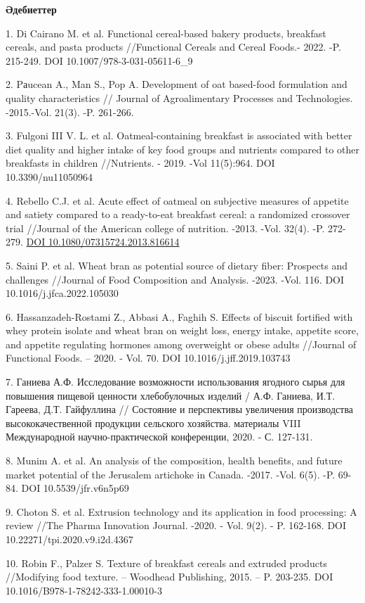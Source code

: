 \begin{center}
{\bfseries Әдебиеттер}
\end{center}

\begin{references}
1. Di Cairano M. et al. Functional cereal-based bakery products,
breakfast cereals, and pasta products //Functional Cereals and Cereal
Foods.- 2022. -P. 215-249. DOI 10.1007/978-3-031-05611-6\_9

2. Pаucean A., Man S., Pop A. Development of oat based-food formulation
and quality characteristics // Journal of Agroalimentary Processes and
Technologies. -2015.-Vol. 21(3). -P. 261-266.

3. Fulgoni III V. L. et al. Oatmeal-containing breakfast is associated
with better diet quality and higher intake of key food groups and
nutrients compared to other breakfasts in children //Nutrients. -
2019. -Vol 11(5):964. DOI 10.3390/nu11050964

4. Rebello C.J. et al. Acute effect of oatmeal on subjective measures of
appetite and satiety compared to a ready-to-eat breakfast cereal: a
randomized crossover trial //Journal of the American college of
nutrition. -2013. -Vol. 32(4). -P. 272-279.
\href{https://doi.org/10.1080/07315724.2013.816614}{DOI
10.1080/07315724.2013.816614}

5. Saini P. et al. Wheat bran as potential source of dietary fiber:
Prospects and challenges //Journal of Food Composition and Analysis.
-2023. -Vol. 116. DOI 10.1016/j.jfca.2022.105030

6. Hassanzadeh-Rostami Z., Abbasi A., Faghih S. Effects of biscuit
fortified with whey protein isolate and wheat bran on weight loss,
energy intake, appetite score, and appetite regulating hormones among
overweight or obese adults //Journal of Functional Foods. -- 2020. -
Vol. 70. DOI 10.1016/j.jff.2019.103743

7. Ганиева А.Ф. Исследование возможности использования ягодного сырья для
повышения пищевой ценности хлебобулочных изделий / А.Ф. Ганиева, И.Т.
Гареева, Д.Т. Гайфуллина // Состояние и перспективы увеличения
производства высококачественной продукции сельского хозяйства.
материалы VIII Международной научно-практической конференции, 2020. -
С. 127-131.

8. Munim A. et al. An analysis of the composition, health benefits, and
future market potential of the Jerusalem artichoke in Canada. -2017.
-Vol. 6(5). -P. 69-84. DOI 10.5539/jfr.v6n5p69

9. Choton S. et al. Extrusion technology and its application in food
processing: A review //The Pharma Innovation Journal. -2020. - Vol.
9(2). - P. 162-168. DOI 10.22271/tpi.2020.v9.i2d.4367

10. Robin F., Palzer S. Texture of breakfast cereals and extruded products
//Modifying food texture. -- Woodhead Publishing, 2015. -- P. 203-235.
DOI 10.1016/B978-1-78242-333-1.00010-3
\end{references}

